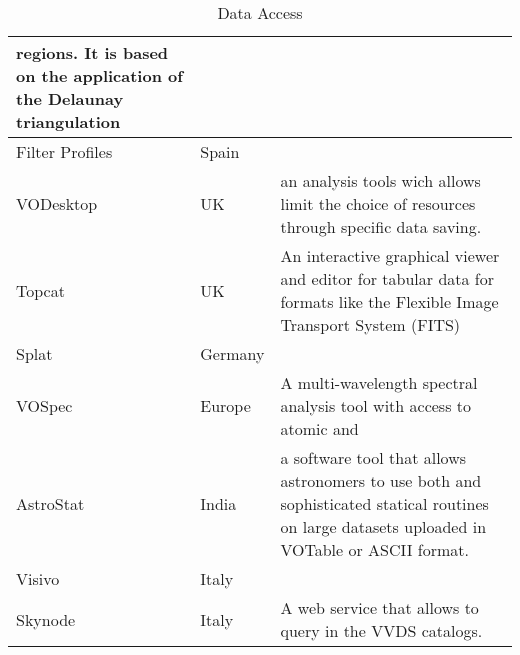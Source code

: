 \begin{table*}[h]
\begin{tabular}{|l|l|p{8.5cm}|}
regions. It is based on the application of the Delaunay triangulation\\
	\hline								 
  Filter Profiles & Spain & \\
   \hline
	VODesktop & UK & an analysis tools wich allows limit the choice of resources through specific data saving.\\
	\hline								 
  Topcat & UK &  An interactive graphical viewer and editor for tabular data for
formats like the Flexible Image Transport System (FITS) \\
	\hline								 
	\hline								 
  Splat & Germany & \\
	\hline								 
   VOSpec & Europe & A multi-wavelength spectral analysis tool with access to
atomic and \\
	\hline								 
 AstroStat & India & a software tool that allows astronomers to use both and sophisticated statical routines on large datasets uploaded in VOTable or
									ASCII format. \\
	\hline								 
  Visivo & Italy & \\
	\hline								 
	Skynode & Italy & A web service that allows to query in the VVDS catalogs. \\
	\hline		
	\end{tabular}
	\caption{Data Access}
	\label{table:da}
\end{table*}

